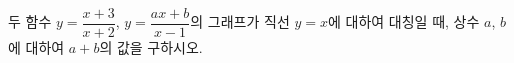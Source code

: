\hspace*{2mm}\begin{minipage}[t]{\dimexpr\linewidth-2mm\relax}\vspace{0pt}
두 함수 $y=\dfrac{x+3}{x+2}$, $y=\dfrac{ax+b}{x-1}$의 그래프가 직선 $y=x$에 대하여 대칭일 때, 상수 $a$, $b$에 대하여 $a+b$의 값을 구하시오.\end{minipage}
